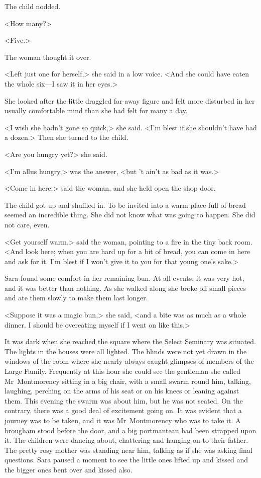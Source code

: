 The child nodded.

<How many?>

<Five.>

The woman thought it over.

<Left just one for herself,> she said in a low voice. <And she could have eaten the whole six—I saw it in her eyes.>

She looked after the little draggled far-away figure and felt more disturbed in her usually comfortable mind than she had felt for many a day.

<I wish she hadn't gone so quick,> she said. <I'm blest if she shouldn't have had a dozen.> Then she turned to the child.

<Are you hungry yet?> she said.

<I'm allus hungry,> was the answer, <but 't ain't as bad as it was.>

<Come in here,> said the woman, and she held open the shop door.

The child got up and shuffled in. To be invited into a warm place full of bread seemed an incredible thing. She did not know what was going to happen. She did not care, even.

<Get yourself warm,> said the woman, pointing to a fire in the tiny back room. <And look here; when you are hard up for a bit of bread, you can come in here and ask for it. I'm blest if I won't give it to you for that young one's sake.>

\divider

Sara found some comfort in her remaining bun. At all events, it was very hot, and it was better than nothing. As she walked along she broke off small pieces and ate them slowly to make them last longer.

<Suppose it was a magic bun,> she said, <and a bite was as much as a whole dinner. I should be overeating myself if I went on like this.>

It was dark when she reached the square where the Select Seminary was situated. The lights in the houses were all lighted. The blinds were not yet drawn in the windows of the room where she nearly always caught glimpses of members of the Large Family. Frequently at this hour she could see the gentleman she called Mr~Montmorency sitting in a big chair, with a small swarm round him, talking, laughing, perching on the arms of his seat or on his knees or leaning against them. This evening the swarm was about him, but he was not seated. On the contrary, there was a good deal of excitement going on. It was evident that a journey was to be taken, and it was Mr~Montmorency who was to take it. A brougham stood before the door, and a big portmanteau had been strapped upon it. The children were dancing about, chattering and hanging on to their father. The pretty rosy mother was standing near him, talking as if she was asking final questions. Sara paused a moment to see the little ones lifted up and kissed and the bigger ones bent over and kissed also.

